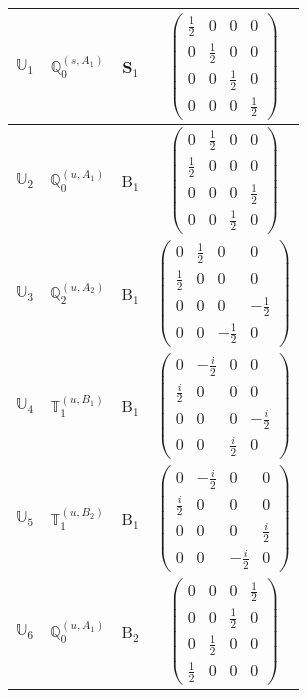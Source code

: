 \documentclass[fleqn,10pt,landscape]{article}
\begin{document}
\begin{itemize}
\begin{center}
\begin{longtable}{c|c|c|c}
$ \mathbb{U}_{1} $ & $\mathbb{Q}_{0}^{(s,A_{1})}$ & S$_{1}$ & $\begin{pmatrix} \frac{1}{2} & 0 & 0 & 0 \\ 0 & \frac{1}{2} & 0 & 0 \\ 0 & 0 & \frac{1}{2} & 0 \\ 0 & 0 & 0 & \frac{1}{2} \end{pmatrix}$ \\ \hline
$ \mathbb{U}_{2} $ & $\mathbb{Q}_{0}^{(u,A_{1})}$ & B$_{1}$ & $\begin{pmatrix} 0 & \frac{1}{2} & 0 & 0 \\ \frac{1}{2} & 0 & 0 & 0 \\ 0 & 0 & 0 & \frac{1}{2} \\ 0 & 0 & \frac{1}{2} & 0 \end{pmatrix}$ \\
$ \mathbb{U}_{3} $ & $\mathbb{Q}_{2}^{(u,A_{2})}$ & B$_{1}$ & $\begin{pmatrix} 0 & \frac{1}{2} & 0 & 0 \\ \frac{1}{2} & 0 & 0 & 0 \\ 0 & 0 & 0 & - \frac{1}{2} \\ 0 & 0 & - \frac{1}{2} & 0 \end{pmatrix}$ \\
$ \mathbb{U}_{4} $ & $\mathbb{T}_{1}^{(u,B_{1})}$ & B$_{1}$ & $\begin{pmatrix} 0 & - \frac{i}{2} & 0 & 0 \\ \frac{i}{2} & 0 & 0 & 0 \\ 0 & 0 & 0 & - \frac{i}{2} \\ 0 & 0 & \frac{i}{2} & 0 \end{pmatrix}$ \\
$ \mathbb{U}_{5} $ & $\mathbb{T}_{1}^{(u,B_{2})}$ & B$_{1}$ & $\begin{pmatrix} 0 & - \frac{i}{2} & 0 & 0 \\ \frac{i}{2} & 0 & 0 & 0 \\ 0 & 0 & 0 & \frac{i}{2} \\ 0 & 0 & - \frac{i}{2} & 0 \end{pmatrix}$ \\ \hline
$ \mathbb{U}_{6} $ & $\mathbb{Q}_{0}^{(u,A_{1})}$ & B$_{2}$ & $\begin{pmatrix} 0 & 0 & 0 & \frac{1}{2} \\ 0 & 0 & \frac{1}{2} & 0 \\ 0 & \frac{1}{2} & 0 & 0 \\ \frac{1}{2} & 0 & 0 & 0 \end{pmatrix}$ \\

\end{longtable}
\end{center}
\end{itemize}
\end{document}
